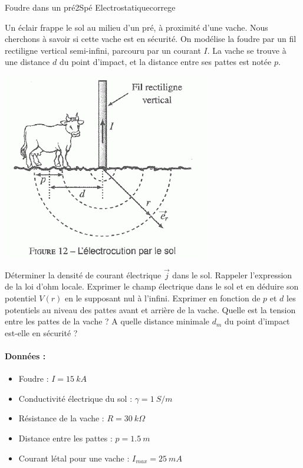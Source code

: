 \begin{exercise}{Foudre dans un pré}{2}{Spé}
{Electrostatique}{correge}

Un éclair frappe le sol au milieu d'un pré, à proximité d'une vache. Nous cherchons à savoir si cette vache est en sécurité. On modélise la foudre par un fil rectiligne vertical semi-infini, parcouru par un courant $I$. La vache se trouve à une distance $d$ du point d'impact, et la distance entre ses pattes est notée $p$. 

\begin{center}
    \includegraphics[width=0.4\linewidth]{electromag/electrostat/vache_foudre.png}
\end{center}

\begin{questions}

    \question Déterminer la densité de courant électrique $\vec{j}$ dans le sol.
    \question Rappeler l'expression de la loi d'ohm locale. Exprimer le champ électrique dans le sol et en déduire son potentiel $V(r)$ en le supposant nul à l'infini.
    \question Exprimer en fonction de $p$ et $d$ les potentiels au niveau des pattes avant et arrière de la vache. Quelle est la tension entre les pattes de la vache ?
    \question A quelle distance minimale $d_m$ du point d'impact est-elle en sécurité ?
    
    
    
\end{questions}

\paragraph{Données :} 
\begin{itemize}
    \item Foudre : $I=\SI{15}{kA}$
    \item Conductivité électrique du sol : $\gamma = \SI{1}{S/m}$
    \item Résistance de la vache : $R= \SI{30}{k\Omega}$
    \item Distance entre les pattes : $p=\SI{1.5}{m}$
    \item Courant létal pour une vache : $I_{max} = \SI{25}{mA}$
\end{itemize}

\end{exercise}

